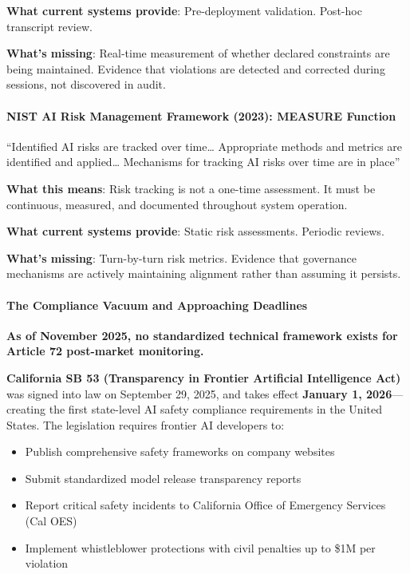 \textbf{What current systems provide}: Pre-deployment validation.
Post-hoc transcript review.

\textbf{What's missing}: Real-time measurement of whether declared
constraints are being maintained. Evidence that violations are detected
and corrected during sessions, not discovered in audit.

\paragraph{NIST AI Risk Management Framework (2023): MEASURE
Function}\label{nist-ai-risk-management-framework-2023-measure-function}

``Identified AI risks are tracked over time\ldots{} Appropriate methods
and metrics are identified and applied\ldots{} Mechanisms for tracking
AI risks over time are in place''

\textbf{What this means}: Risk tracking is not a one-time assessment. It
must be continuous, measured, and documented throughout system
operation.

\textbf{What current systems provide}: Static risk assessments. Periodic
reviews.

\textbf{What's missing}: Turn-by-turn risk metrics. Evidence that
governance mechanisms are actively maintaining alignment rather than
assuming it persists.

\paragraph{The Compliance Vacuum and Approaching
Deadlines}\label{the-compliance-vacuum-and-approaching-deadlines}

\textbf{As of November 2025, no standardized technical framework exists
for Article 72 post-market monitoring.}

\textbf{California SB 53 (Transparency in Frontier Artificial
Intelligence Act)} was signed into law on September 29, 2025, and takes
effect \textbf{January 1, 2026}---creating the first state-level AI
safety compliance requirements in the United States. The legislation
requires frontier AI developers to:

\begin{itemize}
\tightlist
\item
  Publish comprehensive safety frameworks on company websites
\item
  Submit standardized model release transparency reports
\item
  Report critical safety incidents to California Office of Emergency
  Services (Cal OES)
\item
  Implement whistleblower protections with civil penalties up to \$1M
  per violation
\end{itemize}

